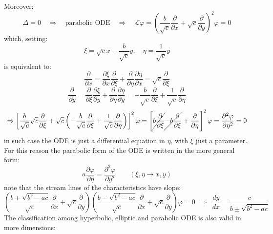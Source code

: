 \documentclass{article}
\newcommand{\vp}{\varphi}
\begin{document}
\noindent
Moreover:
\begin{equation}
    \Delta = 0 \quad \Rightarrow \quad \text{parabolic ODE} \quad \Rightarrow \quad \mathcal{L}\vp = \left( \frac{b}{\sqrt{c}} \frac{\partial}{\partial x} + \sqrt{c} \frac{\partial}{\partial y} \right)^2 \vp = 0
\end{equation}
which, setting:
\begin{equation}
    \xi = \sqrt{c} x -\frac{b}{\sqrt{c}}y, \quad \eta = \frac{1}{\sqrt{c}}y
\end{equation}
is equivalent to:
\begin{equation}
    \frac{\partial}{\partial x}
= \frac{\partial \xi}{\partial x} \frac{\partial}{\partial \xi}
+ \frac{\partial }{\partial \eta} \frac{\partial\eta}{\partial x}
= \sqrt{c} \frac{\partial}{\partial \xi}
\end{equation}
\begin{equation}
    \frac{\partial}{\partial y}
= \frac{\partial}{\partial \xi} \frac{\partial \xi}{\partial y} 
+ \frac{\partial}{\partial \eta} \frac{\partial \eta}{\partial y} 
= -\frac{b}{\sqrt{c}} \frac{\partial}{\partial \xi}
+ \frac{1}{\sqrt{c}} \frac{\partial}{\partial \eta}
\end{equation}
\begin{equation}
    \Rightarrow \left[
\frac{b}{\sqrt{c}} \sqrt{c} \frac{\partial}{\partial \xi}
+ \sqrt{c} \left(
-\frac{b}{\sqrt{c}} \frac{\partial}{\partial \xi}
+ \frac{1}{\sqrt{c}} \frac{\partial}{\partial \eta}
\right)
\right]^2 \varphi
= \left[
\cancel{b\frac{\partial}{\partial \xi}}
\cancel{- b \frac{\partial}{\partial \xi}}
+ \frac{\partial}{\partial \eta}
\right]^2 \varphi
= \frac{\partial^2 \varphi}{\partial \eta^2} = 0
\end{equation}
in such case the ODE is just a differential equation in $\eta$, with $\xi$ just a parameter. For this reason the parabolic form of the ODE is written in the more general form:
\begin{equation}
    a \frac{\partial \vp}{\partial \eta} 
= \frac{\partial^2 \varphi}{\partial y^2}
\qquad (\xi, \eta \to x, y)
\end{equation}
note that the stream lines of the characteristics have slope:
\begin{equation}
    \left( \frac{b+\sqrt{b^2 -ac}}{\sqrt{c}} \frac{\partial}{\partial x} + \sqrt{c} \frac{\partial}{\partial y}
\right)
\left(
\frac{b - \sqrt{b^2 - a c}}{\sqrt{c}} \frac{\partial}{\partial x}
+ \sqrt{c} \frac{\partial}{\partial y}
\right) \varphi = 0 \ \ \Rightarrow \ \ \frac{dy}{dx} = \frac{c}{b \pm \sqrt{b^2 -ac}}
\end{equation}
The classification among hyperbolic, elliptic and parabolic ODE is also valid in more dimensions:
\end{document}
